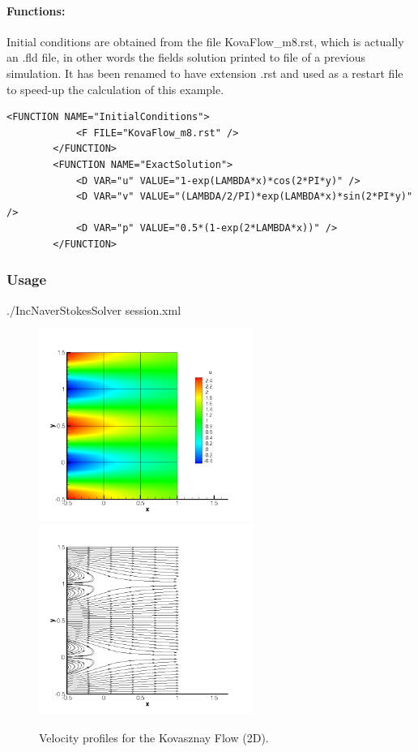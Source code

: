 \paragraph{Functions:~} Initial conditions are obtained from the file KovaFlow\_m8.rst, which is actually an .fld file, in other words the fields solution printed to file of a previous simulation. It has been renamed to have extension .rst and used as a restart file to speed-up the calculation of this example.
\begin{lstlisting}[style=XMLStyle]
  		<FUNCTION NAME="InitialConditions">
    		<F FILE="KovaFlow_m8.rst" />
  		</FUNCTION>
  		<FUNCTION NAME="ExactSolution">
     		<D VAR="u" VALUE="1-exp(LAMBDA*x)*cos(2*PI*y)" />
     		<D VAR="v" VALUE="(LAMBDA/2/PI)*exp(LAMBDA*x)*sin(2*PI*y)" />
     		<D VAR="p" VALUE="0.5*(1-exp(2*LAMBDA*x))" />
  		</FUNCTION>
\end{lstlisting}

\subsubsection{Usage}
./IncNaverStokesSolver session.xml

\begin{figure}
\begin{center}
\includegraphics[width=7cm]{Figures/KF2DCVP8.png}
\includegraphics[width=7cm]{Figures/KF2DCVP8SL.png}
\caption{Velocity profiles for the Kovasznay Flow (2D).}
\end{center}
\end{figure}

